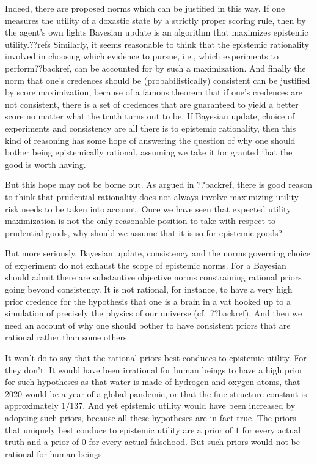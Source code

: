 Indeed, there are proposed norms which can be justified in this way. If one measures the utility of a 
doxastic state by a strictly proper scoring rule, then by the agent's own lights Bayesian update is 
an algorithm that maximizes epistemic utility.??refs Similarly, it seems reasonable to think that the
epistemic rationality involved in choosing which evidence to pursue, i.e., which experiments to perform??backref, 
can be accounted for by such a maximization. And finally the norm that one's credences should be 
(probabilistically) consistent can be justified by score maximization, because of a famous theorem
that if one's credences are not consistent, there is a set of credences that are guaranteed to yield 
a better score no matter what the truth turns out to be. If Bayesian update, choice of experiments and consistency
are all there is to  epistemic rationality, then this kind of reasoning has some hope of answering the question 
of why one should bother being epistemically rational, assuming we take it for granted that the good is worth
having. 

But this hope may not be borne out. As argued in ??backref, there is good reason to think that prudential 
rationality does not always involve maximizing utility---risk needs to be taken into account. Once we have
seen that expected utility maximization is not the only reasonable position to take with respect to prudential
goods, why should we assume that it is so for epistemic goods?

But more seriously, Bayesian update, consistency and the norms governing choice of experiment do not exhaust the 
scope of epistemic norms. For a Bayesian should admit there are substantive objective norms constraining 
rational priors going beyond consistency. It is not rational, for instance, to have a very high
prior credence for the hypothesis that one is a brain in a vat hooked up to a simulation of precisely the 
physics of our universe (cf.\ ??backref). And then we need an account of why one should bother to have consistent 
priors that are rational rather than some others.

It won't do to say that the rational priors best conduces to epistemic utility. For they don't. It would 
have been irrational for human beings to have a high prior for such hypotheses as that water is made of hydrogen
and oxygen atoms, that 2020 would be a year of a global pandemic, or that the fine-structure constant is 
approximately $1/137$. And yet epistemic utility would have been increased by adopting such priors, because 
all these hypotheses are in fact true. The priors that uniquely best conduce to epistemic utility are a 
prior of $1$ for every actual truth and a prior of $0$ for every actual falsehood. But such priors would not 
be rational for human beings. 

